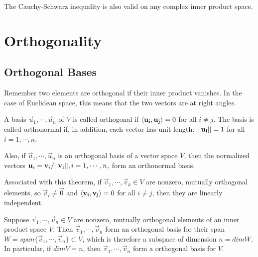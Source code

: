     The Cauchy-Schwarz inequality is also valid on any complex inner product space.

\section{Orthogonality}

    \subsection{Orthogonal Bases}
    Remember two elements are orthogonal if their inner product vanishes. In the case of Euclidean space, this means that the two vectors are at right angles.

    \begin{thm}
    A basis $\vec{u}_1, \cdots, \vec{u}_n$ of $V$ is called orthogonal if $\left\langle \mathbf{u_i}, \mathbf{u_j} \right\rangle = 0$ for all $i \neq j$. The basis is called orthonormal if, in addition, each vector has unit length: $\lvert \lvert \mathbf{u_i} \rvert \rvert = 1$ for all $i=1, \cdots, n$.
    \end{thm}

    Also, if $\vec{u}_1, \cdots, \vec{u}_n$ is an orthogonal basis of a vector space $V$, then the normalized vectors $\mathbf{u}_i = \mathbf{v}_i / \lvert \lvert \mathbf{v_i} \rvert \rvert, i = 1, \cdots, n$, form an orthonormal basis.

    Associated with this theorem, if $\vec{v}_1, \cdots, \vec{v}_k \in V$ are nonzero, mutually orthogonal elements, so $\vec{v}_i \neq \vec{0}$ and $\left\langle \mathbf{v_i}, \mathbf{v_j} \right\rangle = 0$ for all $i \neq j$, then they are linearly independent.

    \begin{thm}
        Suppose $\vec{v}_1, \cdots, \vec{v}_n \in V$ are nonzero, mutually orthogonal elements of an inner product space $V$. Then $\vec{v}_1, \cdots, \vec{v}_n$ form an orthogonal basis for their span $W = span\{\vec{v}_1, \cdots, \vec{v}_n\} \subset V$, which is therefore a subspace of dimension $n = dim W$. In particular, if $dim V = n$, then $\vec{v}_1, \cdots, \vec{v}_n$ form a orthogonal basis for $V$.
    \end{thm}

